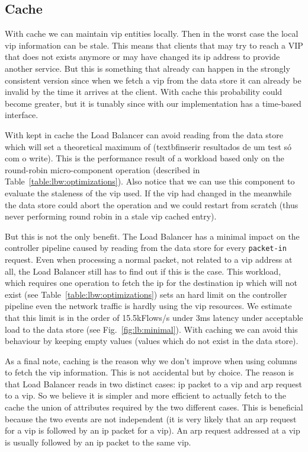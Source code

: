 \subsection{Cache}
With cache  we can maintain \gls{vip} entities locally. Then in the worst case the local \gls{vip} information can be stale.
This means that  clients that may try to reach a VIP that does not exists anymore or may have changed its \gls{ip}  address to provide another service. 
But this is something that already can happen in the strongly consistent version since when we fetch a \gls{vip} from the data store it can already be invalid by the time it arrives at the client. 
With cache this probability could become greater,  but it is tunably  since with our implementation has a time-based interface.

With   kept in cache the Load Balancer can avoid reading from the data store which will set a theoretical maximum of (textbf{inserir resultados de um test só com o write}). This is the performance result of a workload based only on  the round-robin micro-component operation (described in Table~\ref{table:lbw:optimizations}). Also notice that we can use this component to evaluate the staleness of the \gls{vip} used. If the \gls{vip} had changed in the meanwhile the data store could abort the operation and we could restart from scratch (thus never performing round robin in a stale \gls{vip} cached entry). 

But this is not the only benefit. 
The Load Balancer has a minimal impact on the controller pipeline caused by reading from the data store for every \texttt{packet-in} request.  
Even when processing a normal packet, not related to a \gls{vip} address at all, the Load Balancer still has to find out if this is the case. 
This workload, which requires one operation to fetch the \gls{ip} for the destination \gls{ip} which will not exist  (see Table~\ref{table:lbw:optimizations})  sets an hard limit on the controller pipeline even the network traffic is hardly using the \gls{vip} resources. 
We estimate that this limit is in the order of 15.5kFlows/s under 3ms latency under acceptable load to the data store (see Fig.~\ref{fig:lb:minimal}).
With caching we can avoid this behaviour by keeping empty values (values which do not exist in the data store).

As a final note, caching is the reason why we don't improve when using columns  to fetch the \gls{vip} information. 
This is not accidental but by choice. 
The reason is that Load Balancer reads  in two distinct cases: \gls{ip} packet to a \gls{vip} and \gls{arp} request to a \gls{vip}. 
So we believe it is simpler and more efficient to actually fetch to the cache the union of attributes required by the two different
cases. 
This is beneficial because the two events are not independent (it is very likely that an \gls{arp} request for a \gls{vip} is followed by an \gls{ip} packet for a \gls{vip}). 
An \gls{arp} request addressed at a \gls{vip} is usually followed by an \gls{ip} packet to the same \gls{vip}.  

